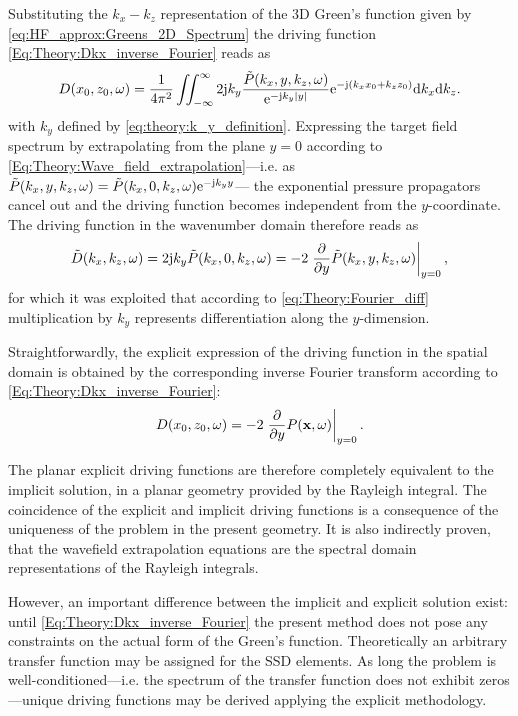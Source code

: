 Substituting the $k_x-k_z$ representation of the 3D Green's function given by \eqref{eq:HF_approx:Greens_2D_Spectrum} the driving function \eqref{Eq:Theory:Dkx_inverse_Fourier} reads as
\begin{equation}
D(x_0,z_0,\omega) = \frac{1}{4\pi^2} \iint_{-\infty}^{\infty} 2\mathrm{j} k_y \frac{\tilde{P}(k_x,y,k_z, \omega)}{ \mathrm{e}^{ -\mathrm{j} k_y  | y |  } } \mathrm{e}^{-\mathrm{j} (k_x x_0 + k_z z_0)} \mathrm{d} k_x \mathrm{d} k_z.
\end{equation}
with $k_y$ defined by \eqref{eq:theory:k_y_definition}.	
Expressing the target field spectrum by extrapolating from the plane $y = 0$ according to \eqref{Eq:Theory:Wave_field_extrapolation}---i.e. as 
$
\tilde{P}(k_x,y,k_z, \omega) = \tilde{P}(k_x,0,k_z, \omega)  \mathrm{e}^{ -\mathrm{j} k_y  y }
$---
the exponential pressure propagators cancel out and the driving function becomes independent from the $y$-coordinate. 
The driving function in the wavenumber domain therefore reads as
\begin{equation}
\tilde{D}(k_x,k_z,\omega) = 2\mathrm{j} k_y \tilde{P}(k_x,0,k_z,\omega) = -2 \left. \frac{\partial}{\partial y} \tilde{P}(k_x,y,k_z,\omega) \right|_{y = 0},
\label{Eq:Theory:Planar_explicit_driv_fun}
\end{equation}
for which it was exploited that according to \eqref{eq:Theory:Fourier_diff} multiplication by $k_y$ represents differentiation along the $y$-dimension.

Straightforwardly, the explicit expression of the driving function in the spatial domain is obtained by the corresponding inverse Fourier transform according to \eqref{Eq:Theory:Dkx_inverse_Fourier}:
\begin{equation}
D(x_0,z_0,\omega) = -2 \left. \frac{\partial}{\partial y} P(\mathbf{x},\omega) \right|_{y = 0}.
\label{Eq:Theory:Planar_explicit_driv_fun_spatial}
\end{equation}

The planar explicit driving functions are therefore completely equivalent to the implicit solution, in a planar geometry provided by the Rayleigh integral.
The coincidence of the explicit and implicit driving functions is a consequence of the uniqueness of the problem in the present geometry.
It is also indirectly proven, that the wavefield extrapolation equations are the spectral domain representations of the Rayleigh integrals.

However, an important difference between the implicit and explicit solution exist: until \eqref{Eq:Theory:Dkx_inverse_Fourier} the present method does not pose any constraints on the actual form of the Green's function. 
Theoretically an arbitrary transfer function may be assigned for the SSD elements. 
As long the problem is well-conditioned---i.e. the spectrum of the transfer function does not exhibit zeros---unique driving functions may be derived applying the explicit methodology.

